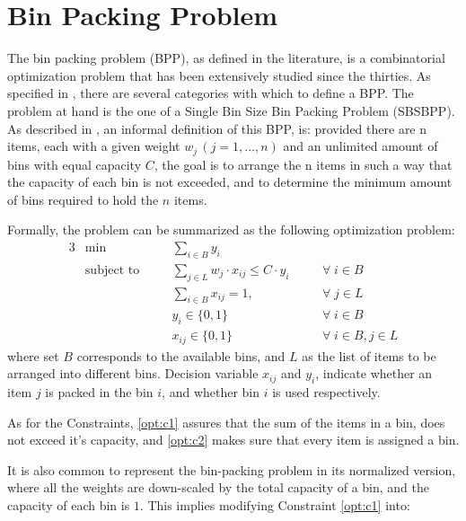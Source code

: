 \chapter{Bin Packing Problem} 
\label{chap:literature review}

The bin packing problem (BPP), as defined in the literature, is a combinatorial
optimization problem that has been extensively studied since the thirties. As
specified in \cite{wascher2007improved}, there are several categories with which
to define a BPP. The problem at hand is the one of a Single Bin Size Bin Packing
Problem (SBSBPP). As described in \cite{delorme2016bin}, an informal definition
of this BPP, is: provided there are n items, each with a given weight \( w_j  \,
(j = 1, ..., n) \) and an unlimited amount of bins with equal capacity \( C \),
the goal is to arrange the n items in such a way that the capacity of each bin
is not exceeded, and to determine the minimum amount of bins required to hold
the $n$ items.

Formally, the problem can be summarized as the following optimization problem:
\begin{alignat}{3}
    &\min       
        &&\sum_{i \in B} y_i 
            && \\
    &\text{subject to} \quad
        && \sum_{j \in L} w_j \cdot x_{ij} \leq C \cdot y_i \quad      
            && \forall \; i \in B \label{opt:c1} \\
    &   && \sum_{i \in B} x_{ij} = 1, \quad                 
            && \forall \; j \in L \label{opt:c2} \\
    &   && y_i \in \{0, 1\}                                 
            && \forall \; i \in B \\
    &   && x_{ij} \in \{0,1\}                               
            && \forall \; i \in B, j \in L
\end{alignat}
where set $B$ corresponds to the available bins, and $L$ as the list of items to
be arranged into different bins. Decision variable $x_{ij}$ and $y_i$, indicate
whether an item $j$ is packed in the bin $i$, and  whether bin $i$ is used
respectively. 

As for the Constraints, \ref{opt:c1} assures that the sum of the items in a bin,
does not exceed it's capacity, and \ref{opt:c2} makes sure that every item is
assigned a bin. 

It is also common to represent the bin-packing problem in its normalized
version, where all the weights are down-scaled by the total capacity of a bin,
and the capacity of each bin is $1$. This implies modifying Constraint
\ref{opt:c1} into:

